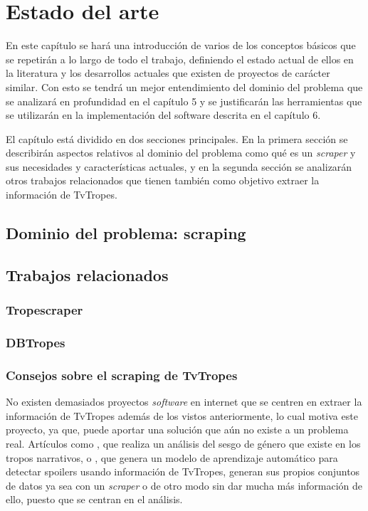 \chapter{Estado del arte}

En este capítulo se hará una introducción de varios de los conceptos básicos que
se repetirán a lo largo de todo el trabajo, definiendo el estado actual de ellos
en la literatura y los desarrollos actuales que existen de proyectos de carácter
similar. Con esto se tendrá un mejor entendimiento del dominio del problema que
se analizará en profundidad en el capítulo 5 y se justificarán las herramientas
que se utilizarán en la implementación del software descrita en el capítulo 6.

El capítulo está dividido en dos secciones principales. En la primera sección se
describirán aspectos relativos al dominio del problema como qué es un
\textit{scraper} y sus necesidades y características actuales, y en la segunda
sección se analizarán otros trabajos relacionados que tienen también como
objetivo extraer la información de TvTropes. 

\section{Dominio del problema: scraping}
\section{Trabajos relacionados}
\subsection{Tropescraper}
\subsection{DBTropes}
\subsection{Consejos sobre el scraping de TvTropes}
No existen demasiados proyectos \textit{software} en internet que se centren en
extraer la información de TvTropes además de los vistos anteriormente, lo cual
motiva este proyecto, ya que, puede aportar una solución que aún no existe a un
problema real. Artículos como \cite{gala2020analyzing}, que realiza un análisis
del sesgo de género que existe en los tropos narrativos, o
\cite{boyd2013spoiler}, que genera un modelo de aprendizaje automático para
detectar spoilers usando información de TvTropes, generan sus propios conjuntos
de datos ya sea con un \textit{scraper} o de otro modo sin dar mucha más
información de ello, puesto que se centran en el análisis. 

